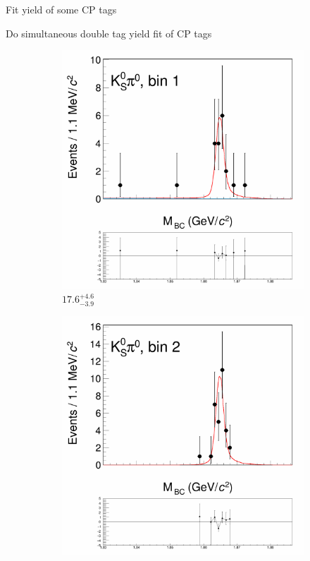 \documentclass{beamer}
\begin{document}
\begin{frame}{Fit yield of some CP tags}
  \begin{center}
    Do simultaneous double tag yield fit of CP tags
  \end{center}
  \begin{figure}
    \centering
    \begin{subfigure}{0.49\textwidth}
      \includegraphics[width = 1.0\textwidth, trim = {0 14cm 0 0}, clip = true]{Plots/DoubleTagYield_DoubleTag_CP_KKpipi_vs_KSpi0_SignalBin1.png}
    \caption{$17.6^{+4.6}_{-3.9}$}
    \end{subfigure}%
    \begin{subfigure}{0.49\textwidth}
      \includegraphics[width = 1.0\textwidth, trim = {0 14cm 0 0}, clip = true]{Plots/DoubleTagYield_DoubleTag_CP_KKpipi_vs_KSpi0_SignalBin2.png}

\end{subfigure}
\end{figure}
\end{frame}
\end{document}
